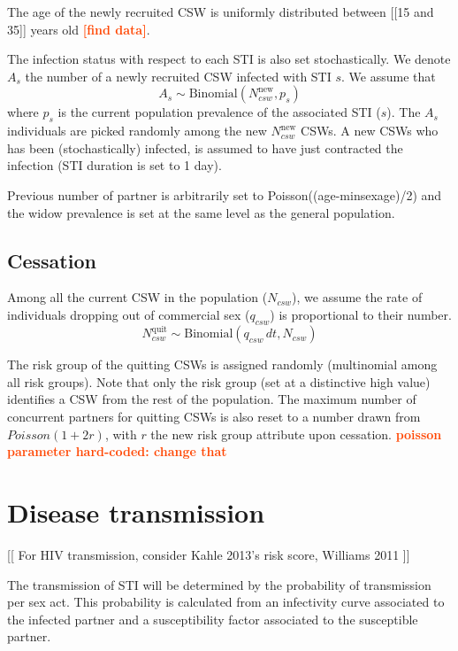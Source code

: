 \documentclass[11pt, onecolumn]{article}
\newcommand{\warning}[1]{\textbf{\textcolor{OrangeRed}{#1}}}
\begin{document}
The age of the newly recruited CSW is uniformly distributed between [[15 and 35]] years old \warning{[find data]}.

The infection status with respect to each STI is also set stochastically. We denote $A_s$ the number of a newly recruited CSW infected with STI $s$. We assume that
$$A_s \sim \text{Binomial}(N_{csw}^{\mathrm{new}},p_s)$$
where $p_s$ is the current population prevalence of the associated STI ($s$). The $A_s$ individuals are picked randomly among the new $N_{csw}^{\mathrm{new}}$ CSWs.
A new CSWs who has been (stochastically) infected, is assumed to have just contracted the infection (STI duration is set to 1 day).

Previous number of partner is arbitrarily set to Poisson((age-minsexage)/2) and the widow prevalence is set at the same level as the general population.

\subsection{Cessation}

Among all the current CSW in the population ($N_{csw}$), we assume the rate of individuals dropping out of commercial sex ($q_{csw}$) is proportional to their number.
$$N_{csw}^{\mathrm{quit}} \sim \text{Binomial}\left(q_{csw}\,dt,N_{csw}\right)$$

The risk group of the quitting CSWs is assigned randomly (multinomial among all risk groups). Note that only the risk group (set at a distinctive high value) identifies a CSW from the rest of the population. 
The maximum number of concurrent partners for quitting CSWs is also reset to a number drawn from $Poisson(1+2r)$, with $r$ the new risk group attribute upon cessation. \warning{poisson parameter hard-coded: change that}




\section{Disease transmission}

[[ For HIV transmission, consider Kahle 2013's risk score, Williams 2011 ]]

The transmission of STI will be determined by the probability of transmission per sex act. This probability is calculated from an infectivity curve associated to the infected partner and a susceptibility factor associated to the susceptible partner.
\end{document}

